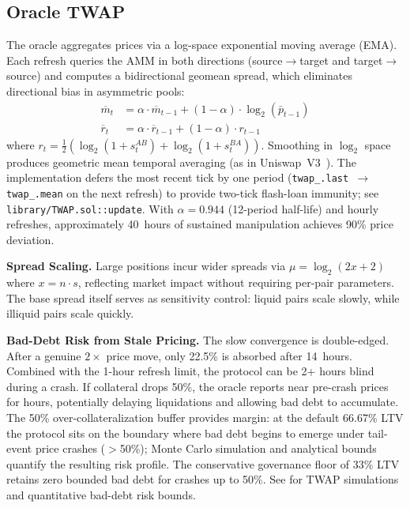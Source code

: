 \documentclass[10pt,a4paper,twocolumn]{article}
\begin{document}
\subsection{Oracle TWAP}
\label{subsec:oracle-twap}

The oracle aggregates prices via a log-space exponential moving average (EMA). Each refresh queries the AMM in both directions (source$\to$target and target$\to$source) and computes a bidirectional geomean spread, which eliminates directional bias in asymmetric pools:
\begin{align}
\overline{m}_t &= \alpha \cdot \overline{m}_{t-1} + (1{-}\alpha) \cdot \log_2(\bar{p}_{t-1}) \\
\overline{r}_t &= \alpha \cdot \overline{r}_{t-1} + (1{-}\alpha) \cdot r_{t-1}
\end{align}
where $r_t = \frac{1}{2}(\log_2(1+s^{AB}_t) + \log_2(1+s^{BA}_t))$. Smoothing in $\log_2$ space produces geometric mean temporal averaging (as in Uniswap~V3~\cite{uniswap2021}). The implementation defers the most recent tick by one period (\texttt{twap\_.last $\to$ twap\_.mean} on the next refresh) to provide two-tick flash-loan immunity; see \texttt{library/TWAP.sol::update}. With $\alpha = 0.944$ (12-period half-life) and hourly refreshes, approximately 40~hours of sustained manipulation achieves 90\% price deviation.

\textbf{Spread Scaling.} Large positions incur wider spreads via $\mu = \log_2(2x + 2)$ where $x = n \cdot s$, reflecting market impact without requiring per-pair parameters. The base spread itself serves as sensitivity control: liquid pairs scale slowly, while illiquid pairs scale quickly.

\textbf{Bad-Debt Risk from Stale Pricing.} The slow convergence is double-edged. After a genuine $2\times$ price move, only 22.5\% is absorbed after 14~hours. Combined with the 1-hour refresh limit, the protocol can be 2+ hours blind during a crash. If collateral drops 50\%, the oracle reports near pre-crash prices for hours, potentially delaying liquidations and allowing bad debt to accumulate. The 50\% over-collateralization buffer provides margin: at the default 66.67\% LTV the protocol sits on the boundary where bad debt begins to emerge under tail-event price crashes ($>$50\%); Monte Carlo simulation and analytical bounds quantify the resulting risk profile. The conservative governance floor of 33\% LTV retains zero bounded bad debt for crashes up to 50\%. See \cite{sim} for TWAP simulations and quantitative bad-debt risk bounds.
\end{document}
